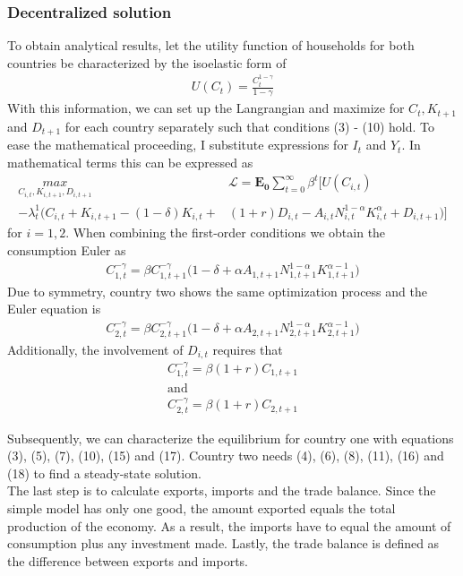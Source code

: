 \documentclass{article}
\begin{document}
\subsubsection{Decentralized solution}

To obtain analytical results, let the utility function of households for both countries be characterized by the isoelastic form of
\begin{align}
U(C_t) = \frac{C_t^{1-\gamma}}{1-\gamma}
\end{align}
With this information, we can set up the Langrangian and maximize for $C_t, K_{t+1}$ and $D_{t+1}$ for each country separately such that conditions (3) - (10) hold. To ease the mathematical proceeding, I substitute expressions for $I_t$ and $Y_t$.
In mathematical terms this can be expressed as
\begin{align*}
\underset{C_{i, t}, K_{i, t+1}, D_{i, t+1}}{max} &\mathcal{L} = \mathbf{E_0} \sum_{t=0}^{\infty} \beta^t \Bigg[ U(C_{i, t}) \\ - \lambda_t^1 \Big( C_{i, t} + K_{i, t+1} - (1 - \delta)K_{i, t} + &(1+r)D_{i, t} - A_{i, t} N_{i, t}^{1-\alpha} K_{i, t}^{\alpha} + D_{i, t+1} \Big) \Bigg]
\end{align*}
for $i = 1,2$. When combining the first-order conditions we obtain the consumption Euler as 
\begin{align}
C_{1, t}^{-\gamma} = \beta C_{1, t+1}^{-\gamma} \big( 1 - \delta + \alpha A_{1, t+1} N_{1, t+1}^{1 - \alpha} K_{1, t+1}^{\alpha -1} \big)
\end{align}
Due to symmetry, country two shows the same optimization process and the Euler equation is 
\begin{align}
C_{2, t}^{-\gamma} = \beta C_{2, t+1}^{-\gamma} \big( 1 - \delta + \alpha A_{2, t+1} N_{2, t+1}^{1 - \alpha} K_{2, t+1}^{\alpha -1} \big)
\end{align}
Additionally, the involvement of $D_{i, t}$ requires that
\begin{align}
C_{1, t}^{-\gamma} = \beta (1 + r) C_{1, t+1} \\ \text{and} \\
C_{2, t}^{-\gamma} = \beta (1 + r) C_{2, t+1}
\end{align}

Subsequently, we can characterize the equilibrium for country one with equations (3), (5), (7), (10), (15) and (17). Country two needs (4), (6), (8), (11), (16) and (18) to find a steady-state solution. \\
The last step is to calculate exports, imports and the trade balance. Since the simple model has only one good, the amount exported equals the total production of the economy. As a result, the imports have to equal the amount of consumption plus any investment made. Lastly, the trade balance is defined as the difference between exports and imports.
\end{document}
